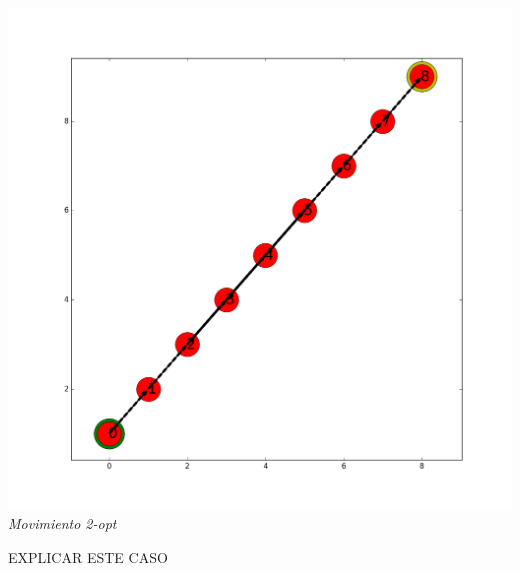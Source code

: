 \vspace*{0.3cm} \vspace*{0.3cm}
  \begin{center}
 \includegraphics[scale=0.3]{./EJ3/ejemplo2opt.png}\\
 {            \textit{Movimiento 2-opt}}
  \end{center}
  \vspace*{0.3cm}

  EXPLICAR ESTE CASO\\
  
